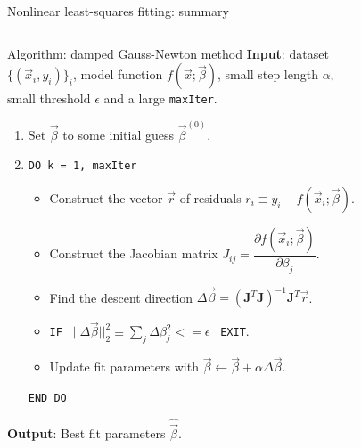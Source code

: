 \documentclass[10pt,aspectratio=169,handout]{beamer}
\begin{document}
\begin{frame}{Nonlinear least-squares fitting: summary}
	\begin{columns}
		\begin{block}{Algorithm: damped Gauss-Newton method}
			\textbf{Input}: dataset $\{(\vec{x}_i,y_i)\}_i$, model function $f(\vec{x};\vec{\beta})$, small step length $\alpha$, small threshold $\epsilon$ and a large \texttt{maxIter}. \\
			\pause
			\begin{enumerate}
				\item Set $\vec{\beta}$ to some initial guess $\vec{\beta}^{(0)}$.\pause
				\item \texttt{DO k = 1, maxIter}
				\begin{itemize}[<+->]
					\pause\item Construct the vector $\vec{r}$ of residuals $r_i \equiv  y_i - f(\vec{x}_i;\vec{\beta})$.
					\item Construct the Jacobian matrix $J_{ij} = \dfrac{\partial f(\vec{x}_i;\vec{\beta})}{\partial\beta_j}$.
					\item Find the descent direction $\Delta\vec{\beta} = (\mathbf{J}^T \mathbf{J})^{-1}\mathbf{J}^T \vec{r}$.
					\vspace{0.2cm}
					\item \texttt{IF}~ $||\Delta\vec{\beta}||_2^2 \equiv \sum_j \Delta\beta_j^2 <= \epsilon$~ \texttt{EXIT}.
					\vspace{0.2cm}
					\item Update fit parameters with $\vec{\beta}\leftarrow\vec{\beta}+\alpha\Delta\vec{\beta}$.
				\end{itemize}
				\texttt{END DO}
			\end{enumerate}
			\pause
			\textbf{Output}: Best fit parameters $\hat{\vec{\beta}}$.
		\end{block}
			\pause
		\begin{figure}
			\centering

\end{figure}
\end{columns}
\end{frame}
\end{document}
